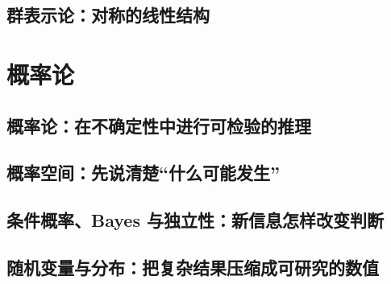 \documentclass[UTF8,openany]{ctexbook}
\theoremstyle{definition}
\theoremstyle{plain}
\begin{document}
\chapter*{群表示论：对称的线性结构}
\label{ch:035}




\clearpage
\part{概率论}
\chapter*{概率论：在不确定性中进行可检验的推理}
\label{ch:036}

\clearpage
\chapter*{概率空间：先说清楚``什么可能发生''}
\label{ch:037}




\clearpage
\chapter*{条件概率、Bayes 与独立性：新信息怎样改变判断}
\label{ch:038}





\clearpage
\chapter*{随机变量与分布：把复杂结果压缩成可研究的数值}
\label{ch:039}





\clearpage
\end{document}
